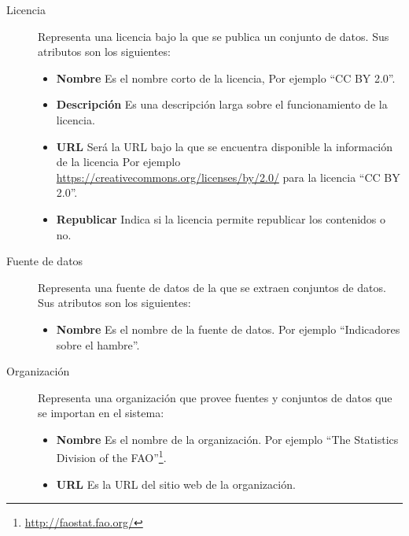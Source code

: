 \begin{description}
\begin{itemize}
							\end{itemize}
\item[Licencia]  Representa una licencia bajo la que se publica un conjunto de datos.  Sus atributos son los siguientes:
							\begin{itemize}
							\item \textbf{Nombre}  Es el nombre corto de la licencia,  Por ejemplo  ``CC BY 2.0''.
							\item \textbf{Descripción}  Es una descripción larga sobre el funcionamiento de la licencia.
							\item \textbf{URL}  Será la URL bajo la que se encuentra disponible la información de la licencia  Por ejemplo \url{https://creativecommons.org/licenses/by/2.0/} para la licencia ``CC BY 2.0''.
							\item \textbf{Republicar}  Indica si la licencia permite republicar los contenidos o no.
							\end{itemize}
\item[Fuente de datos] Representa una fuente de datos de la que se extraen conjuntos de datos.  Sus atributos son los siguientes:
							\begin{itemize}
							\item \textbf{Nombre}  Es el nombre de la fuente de datos.  Por ejemplo ``Indicadores sobre el hambre''.
							\end{itemize}
\item[Organización]  Representa una organización que provee fuentes y conjuntos de datos que se importan en el sistema:
							\begin{itemize}
							\item \textbf{Nombre}  Es el nombre de la organización.  Por ejemplo  ``The Statistics Division of the FAO''\footnote{\url{http://faostat.fao.org/}}.
							\item \textbf{URL}  Es la URL del sitio web de la organización.
							\end{itemize}
\end{description}
